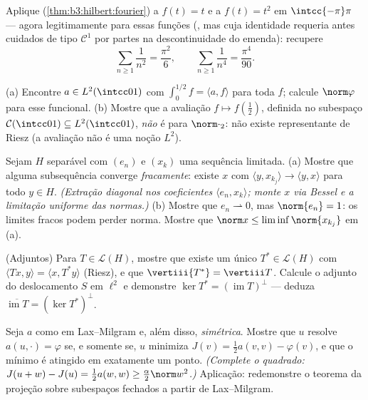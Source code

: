 \begin{exercise}[$\star\star$]\label{exo:b3:hilbert:5}
Aplique  (\cref{thm:b3:hilbert:fourier}) a $f(t) = t$ e a $f(t) = t^2$ em $\intcc{-\pi}\pi$ --- agora
legitimamente para essas funções (, mas cuja identidade
requeria antes cuidados de tipo $\mathcal C^1$ por partes na descontinuidade do
emenda): recupere
\[
\sum_{n\geq1}\frac1{n^2} = \frac{\pi^2}6,
\qquad
\sum_{n\geq1}\frac1{n^4} = \frac{\pi^4}{90} .
\]
\end{exercise}

\begin{exercise}[$\star\star$]\label{exo:b3:hilbert:6}
(a) Encontre $a \in L^2(\intcc01)$ com $\int_0^{1/2}f =
\langle a, f\rangle$ para toda $f$; calcule $\norm\varphi$ para esse
funcional.
(b) Mostre que a avaliação $f \mapsto f(\frac12)$, definida no subespaço $\mathcal C(\intcc01) \subseteq
L^2(\intcc01)$,
\emph{não} é  para $\norm\cdot_2$: não existe representante de Riesz (a
avaliação não é uma noção $L^2$).
\end{exercise}

\begin{exercise}[$\star\star\star$]\label{exo:b3:hilbert:7}
Sejam $H$ separável com  $(e_n)$ e $(x_k)$
uma sequência limitada.
(a) Mostre que alguma subsequência converge \emph{fracamente}: existe
$x$ com $\langle y, x_{k_j}\rangle \to \langle y,
x\rangle$ para todo $y \in H$. \emph{(Extração diagonal nos
coeficientes $\langle e_n, x_k\rangle$; monte $x$ via Bessel e a limitação uniforme das
normas.)}
(b) Mostre que $e_n \rightharpoonup 0$, mas $\norm{e_n} = 1$: os limites fracos podem perder norma.
Mostre que $\norm x \leq
\liminf\norm{x_{k_j}}$ em (a).
\end{exercise}

\begin{exercise}[$\star\star$]\label{exo:b3:hilbert:8}
(Adjuntos) Para $T \in \mathcal L(H)$, mostre que existe um único $T^* \in \mathcal L(H)$ com $\langle Tx, y\rangle = \langle
x, T^*y\rangle$
(Riesz), e que $\vertiii{T^*} = \vertiii T$. Calcule o adjunto do deslocamento $S$ em
$\ell^2$ e demonstre $\ker T^* = (\operatorname{im}T)^\perp$ --- deduza $\overline{\operatorname{im}T} = (\ker T^*)^\perp$.
\end{exercise}

\begin{exercise}[$\star\star$]\label{exo:b3:hilbert:9}
Seja $a$ como em Lax--Milgram e, além disso, \emph{simétrica}.
Mostre que $u$ resolve $a(u, \cdot) = \varphi$ se, e somente se, $u$ minimiza
$J(v) = \frac12a(v, v) - \varphi(v)$, e que o mínimo é atingido em exatamente um ponto. \emph{(Complete
o quadrado: $J(u + w) - J(u) = \frac12a(w,w) \geq
\frac\alpha2\norm w^2$.)} Aplicação: redemonstre o teorema da projeção sobre
subespaços fechados a partir de Lax--Milgram.
\end{exercise}

